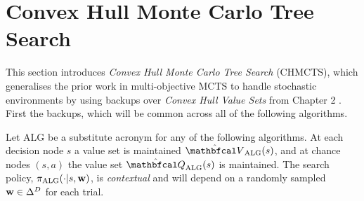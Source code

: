 


        







    






\section{Convex Hull Monte Carlo Tree Search}
\label{sec:5-3-chmcts}










    This section introduces \textit{Convex Hull Monte Carlo Tree Search} (CHMCTS), which generalises the prior work in multi-objective MCTS  to handle stochastic environments by using backups over \textit{Convex Hull Value Sets} from Chapter 2 . First the backups, which will be common across all of the following algorithms.

    Let ALG be a substitute acronym for any of the following algorithms. At each decision node $s$ a value set is maintained $\Valg(s)$, and at chance nodes $(s,a)$ the value set $\Qalg(s)$ is maintained. The search policy, ${\pi_{{\textnormal{ALG}}}}(\cdot|s,\mathbf{w})$, is \textit{contextual} and will depend on a randomly sampled $\mathbf{w}\in\Delta^D$ for each trial. 

